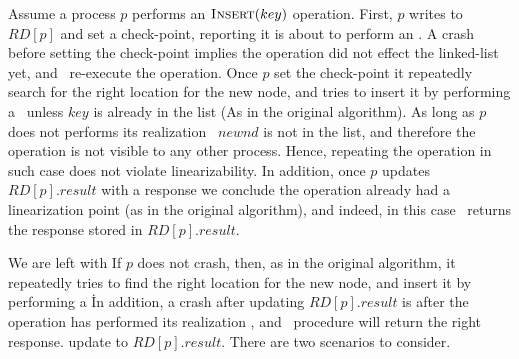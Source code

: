 {

Assume a process $p$ performs an $\mbox{\sc Insert}(key)$ operation.
First, $p$ writes to $RD[p]$ and set a check-point, reporting it is about to perform an \insertlst. A crash before setting the check-point implies the operation did not effect the linked-list yet, and \insertrecover\ re-execute the operation.
Once $p$ set the check-point it repeatedly search for the right location for the new node, 
and tries to insert it by performing a \CAS\, unless $key$ is already in the list (As in the original algorithm).
As long as $p$ does not performs its realization \CAS\ $newnd$ is not in the list, and therefore the operation is not visible to any other process. Hence, repeating the operation in such case does not violate linearizability. In addition, once $p$ updates $RD[p].result$ with a response we conclude the operation already had a linearization point (as in the original algorithm), and indeed, in this case \insertrecover\ returns the response stored in $RD[p].result$.

We are left with 
If $p$ does not crash, then, as in the original algorithm, 
it repeatedly tries to find the right location for the new node, 
and insert it by performing a \CAS\.
In addition, a crash after updating $RD[p].result$ 
is after the operation has performed its realization \CAS,
and \insertrecover\ procedure will return 
the right response.  update to $RD[p].result$. 
There are two scenarios to consider.

}
